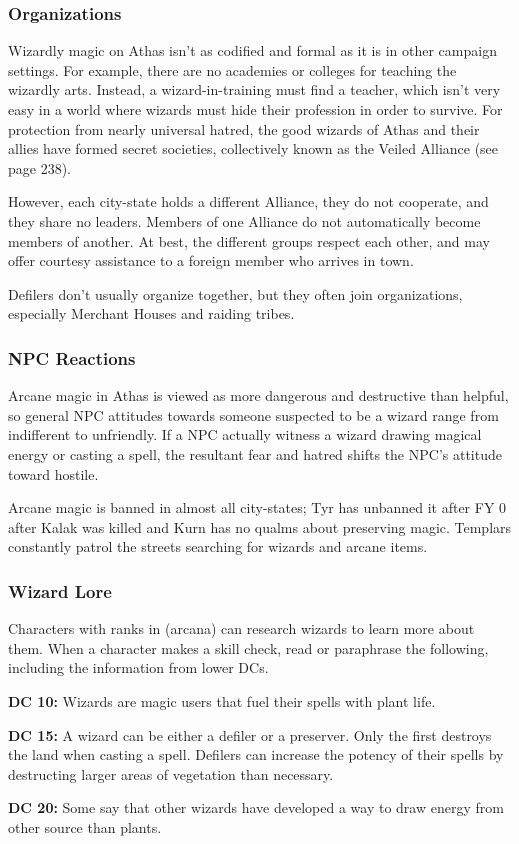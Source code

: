 \subsubsection{Organizations}
Wizardly magic on Athas isn't as codified and formal as it is in other campaign settings. For example, there are no academies or colleges for teaching the wizardly arts. Instead, a wizard-in-training must find a teacher, which isn't very easy in a world where wizards must hide their profession in order to survive. For protection from nearly universal hatred, the good wizards of Athas and their allies have formed secret societies, collectively known as the Veiled Alliance (see page 238).

However, each city-state holds a different Alliance, they do not cooperate, and they share no leaders. Members of one Alliance do not automatically become members of another. At best, the different groups respect each other, and may offer courtesy assistance to a foreign member who arrives in town.

Defilers don't usually organize together, but they often join organizations, especially Merchant Houses and raiding tribes.

\subsubsection{NPC Reactions}
Arcane magic in Athas is viewed as more dangerous and destructive than helpful, so general NPC attitudes towards someone suspected to be a wizard range from indifferent to unfriendly. If a NPC actually witness a wizard drawing magical energy or casting a spell, the resultant fear and hatred shifts the NPC's attitude toward hostile.

Arcane magic is banned in almost all city-states; Tyr has unbanned it after FY 0 after Kalak was killed and Kurn has no qualms about preserving magic. Templars constantly patrol the streets searching for wizards and arcane items.

\subsubsection{Wizard Lore}

Characters with ranks in  (arcana) can research wizards to learn more about them. When a character makes a skill check, read or paraphrase the following, including the information from lower DCs.

\textbf{DC 10:} Wizards are magic users that fuel their spells with plant life.

\textbf{DC 15:} A wizard can be either a defiler or a preserver. Only the first destroys the land when casting a spell. Defilers can increase the potency of their spells by destructing larger areas of vegetation than necessary.

\textbf{DC 20:} Some say that other wizards have developed a way to draw energy from other source than plants.